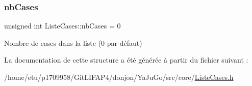 \subsubsection{\texorpdfstring{nb\+Cases}{nbCases}}
{\footnotesize\ttfamily unsigned int Liste\+Cases\+::nb\+Cases = 0}

Nombre de cases dans la liste (0 par défaut) 

La documentation de cette structure a été générée à partir du fichier suivant \+:\begin{DoxyCompactItemize}
\item 
/home/etu/p1709958/\+Git\+L\+I\+F\+A\+P4/donjon/\+Ya\+Ju\+Go/src/core/\mbox{\hyperlink{ListeCases_8h}{Liste\+Cases.\+h}}\end{DoxyCompactItemize}

